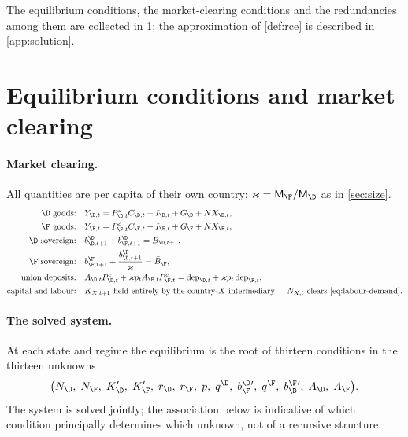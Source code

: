 The equilibrium conditions, the market-clearing conditions and the redundancies
among them are collected in \cref{app:equilibrium}; the approximation of
\cref{def:rce} is described in \cref{app:solution}.


\section{Equilibrium conditions and market clearing}
\label{app:equilibrium}

\paragraph{Market clearing.} All quantities are per capita of their own country;
$\varkappa=\mathsf{M}_\F/\mathsf{M}_\D$ as in \cref{sec:size}.
\begin{align}
\text{$\D$ goods:}\quad
& Y_{\D,t}=P^{c}_{\D,t}C_{\D,t}+I_{\D,t}+G_\D+NX_{\D,t},
\label{eq:mkt-goods}\\
\text{$\F$ goods:}\quad
& Y_{\F,t}=P^{c}_{\F,t}C_{\F,t}+I_{\F,t}+G_\F+NX_{\F,t},
\label{eq:mkt-goods-F}\\
\text{$\D$ sovereign:}\quad
& b^{\D}_{\D,t+1}+b^{\D}_{\F,t+1}=B_{\D,t+1},
\label{eq:mkt-bD}\\
\text{$\F$ sovereign:}\quad
& b^{\F}_{\F,t+1}+\frac{b^{\F}_{\D,t+1}}{\varkappa}=\bar B_\F,
\label{eq:mkt-bF}\\
\text{union deposits:}\quad
& A_{\D,t}P^{c}_{\D,t}+\varkappa p_t A_{\F,t}P^{c}_{\F,t}
   =\mathrm{dep}_{\D,t}+\varkappa p_t\,\mathrm{dep}_{\F,t},
\label{eq:mkt-dep-repeat}\\
\text{capital and labour:}\quad
& K_{X,t+1}\ \text{held entirely by the country-$X$ intermediary},\quad
  N_{X,t}\ \text{clears \eqref{eq:labour-demand}.}
\label{eq:mkt-KN}
\end{align}

\paragraph{The solved system.} At each state and regime the equilibrium is the
root of thirteen conditions in the thirteen unknowns
\[
\bigl(N_\D,\;N_\F,\;K'_\D,\;K'_\F,\;r_\D,\;r_\F,\;p,\;
q^{\D},\;b^{\D}_{\F}{}',\;q^{\F},\;b^{\F}_{\D}{}',\;A_\D,\;A_\F\bigr).
\]
The system is solved jointly; the association below is indicative of which
condition principally determines which unknown, not of a recursive structure.

